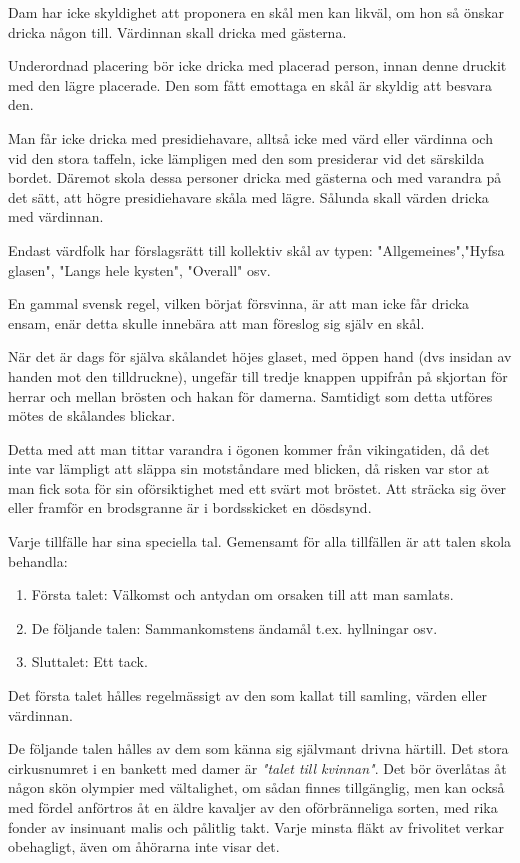 Dam har icke skyldighet att proponera en skål men kan likväl, om hon så önskar dricka någon till. Värdinnan skall dricka med gästerna.

Underordnad placering bör icke dricka med placerad person, innan denne druckit med den lägre placerade. Den som fått emottaga en skål är skyldig att besvara den.

Man får icke dricka med presidiehavare, alltså icke med värd eller värdinna och vid den stora taffeln, icke lämpligen med den som presiderar vid det särskilda bordet. Däremot skola dessa personer dricka med gästerna och med varandra på det sätt, att högre presidiehavare skåla med lägre. Sålunda skall värden dricka med värdinnan.

Endast värdfolk har förslagsrätt till kollektiv skål av typen: "Allgemeines","Hyfsa glasen", "Langs hele kysten", "Overall" osv.

En gammal svensk regel, vilken börjat försvinna, är att man icke får dricka ensam, enär detta skulle innebära att man föreslog sig själv en skål.

När det är dags för själva skålandet höjes glaset, med öppen hand (dvs insidan av handen mot den tilldruckne), ungefär till tredje knappen uppifrån på skjortan för herrar och mellan brösten och hakan för damerna. Samtidigt som detta utföres mötes de skålandes blickar.

Detta med att man tittar varandra i ögonen kommer från vikingatiden, då det inte var lämpligt att släppa sin motståndare med blicken, då risken var stor at man fick sota för sin oförsiktighet med ett svärt mot bröstet. Att sträcka sig över eller framför en brodsgranne är i bordsskicket en dösdsynd.


Varje tillfälle har sina speciella tal. Gemensamt för alla tillfällen är att talen skola behandla:
\begin{enumerate}
    \item Första talet: Välkomst och antydan om orsaken till att man samlats.
    \item De följande talen: Sammankomstens ändamål t.ex. hyllningar osv.
    \item Sluttalet: Ett tack.
\end{enumerate}

Det första talet hålles regelmässigt av den som kallat till samling, värden eller värdinnan.

De följande talen hålles av dem som känna sig självmant drivna härtill. Det stora cirkusnumret i en bankett med damer är \textit{"talet till kvinnan"}. Det bör överlåtas åt någon skön olympier med vältalighet, om sådan finnes tillgänglig, men kan också med fördel anförtros åt en äldre kavaljer av den oförbränneliga sorten, med rika fonder av insinuant malis och pålitlig takt. Varje minsta fläkt av frivolitet verkar obehagligt, även om åhörarna inte visar det.

